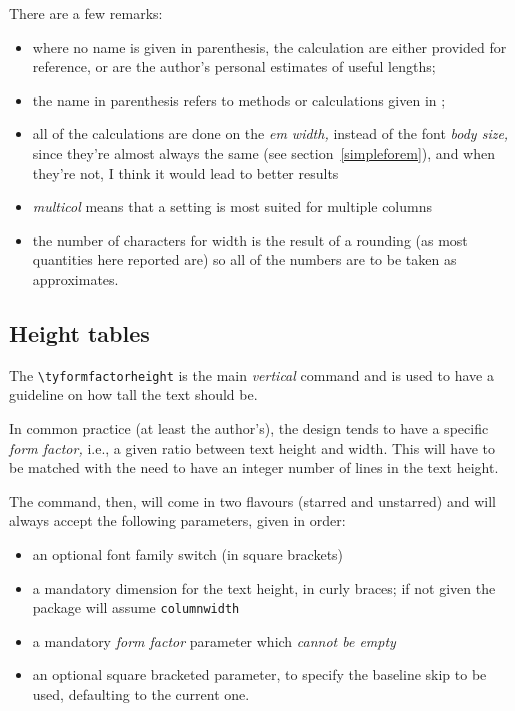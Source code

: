 \documentclass{article}
\makeatletter
\let\@@oldmpar\marginpar
\renewcommand{\marginpar}[1]{\@@oldmpar{\small#1}}
\makeatother
\begin{document}
There are a few remarks:
\begin{itemize}
\item where no name is given in parenthesis, the calculation are either provided for reference, or are the author’s personal estimates of useful lengths;
\item the name in parenthesis refers to methods or calculations given in \cite{bib:bringhurst,bib:felici};
\item all of the calculations are done on the \emph{em width,} instead of the font \emph{body size,} since they’re almost always the same (see section~\vref{simpleforem}), and when they’re not, I think it would lead to better results
\item \emph{multicol} means that a setting is most suited for multiple columns 
\item the number of characters for width is the result of a rounding (as most quantities here reported are) so all of the numbers are to be taken as approximates.
\end{itemize}

\subsection{Height tables}\label{heighttables}
The \marginpar{\textbackslash tyformfactorheight} \verb|\tyformfactorheight| is the main \emph{vertical} command and is used to have a guideline on how tall the text should be. 

In common practice (at least the author’s), the design tends to have a specific \emph{form factor,} i.e., a given ratio between text height and width. This will have to be matched with the need to have an integer number of lines in the text height. 

The command, then, will come in two flavours (starred and unstarred) and will always accept the following parameters, given in order:
\begin{itemize}
\item an optional font family switch (in square brackets)
\item a mandatory dimension for the text height, in curly braces; if not given the package will assume \texttt{columnwidth}
\item a mandatory \emph{form factor} parameter which \emph{cannot be empty}
\item an optional square bracketed parameter, to specify the baseline skip to be used, defaulting to the current one.
\end{itemize}
\end{document}
